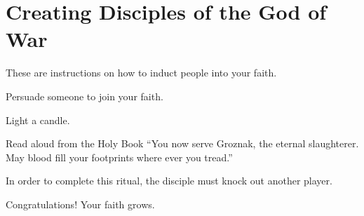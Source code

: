 \documentclass[green]{guildcamp2}
\begin{document}
\name{\gBaptism{}}

\section{Creating Disciples of the God of War}
These are instructions on how to induct people into your faith.

\begin{enum}[Requirements]
	\item {\iHolyBook{}}
	\item {\iCFungus{}}
	\item {\iCandle{}}
\end{enum}

\begin{enum}[Directions]
	\item Persuade someone to join your faith.
	\item Light a candle.
	\item Read aloud from the Holy Book "`You now serve Groznak, the eternal slaughterer. May blood fill your footprints where ever you tread."'
	\item In order to complete this ritual, the disciple must knock out another player.
	\item Congratulations! Your faith grows.

\end{enum}
	
\end{document}
